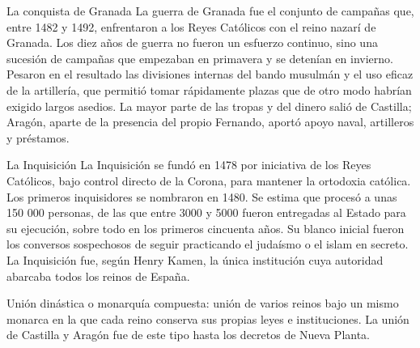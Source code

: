 \documentclass{book}
\begin{document}
\begin{tcolorbox}[title={Definición}, studiumdef, breakable]

La conquista de Granada
La guerra de Granada fue el conjunto de campañas que, entre 1482 y 1492, enfrentaron a los Reyes Católicos con el reino nazarí de Granada. Los diez años de guerra no fueron un esfuerzo continuo, sino una sucesión de campañas que empezaban en primavera y se detenían en invierno. Pesaron en el resultado las divisiones internas del bando musulmán y el uso eficaz de la artillería, que permitió tomar rápidamente plazas que de otro modo habrían exigido largos asedios. La mayor parte de las tropas y del dinero salió de Castilla; Aragón, aparte de la presencia del propio Fernando, aportó apoyo naval, artilleros y préstamos.

\end{tcolorbox}

\begin{tcolorbox}[title={Definición}, studiumdef, breakable]

La Inquisición
La Inquisición se fundó en 1478 por iniciativa de los Reyes Católicos, bajo control directo de la Corona, para mantener la ortodoxia católica. Los primeros inquisidores se nombraron en 1480. Se estima que procesó a unas 150 000 personas, de las que entre 3000 y 5000 fueron entregadas al Estado para su ejecución, sobre todo en los primeros cincuenta años. Su blanco inicial fueron los conversos sospechosos de seguir practicando el judaísmo o el islam en secreto. La Inquisición fue, según Henry Kamen, la única institución cuya autoridad abarcaba todos los reinos de España.

\end{tcolorbox}

\begin{tcolorbox}[title={Definición}, studiumdef, breakable]

Unión dinástica o monarquía compuesta: unión de varios reinos bajo un mismo monarca en la que cada reino conserva sus propias leyes e instituciones. La unión de Castilla y Aragón fue de este tipo hasta los decretos de Nueva Planta.

\end{tcolorbox}
\end{document}
